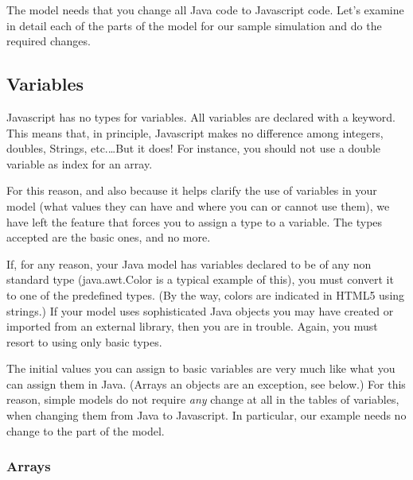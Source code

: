The model needs that you change all Java code to Javascript code. Let's examine in detail each of the parts of the model for our sample simulation and do the required changes.

\subsection{Variables}

Javascript has no types for variables. All variables are declared with a  keyword. This means that, in principle, Javascript makes no difference among integers, doubles, Strings, etc.\ldots But it does! For instance, you should not use a double variable as index for an array.

For this reason, and also because it helps clarify the use of variables in your model (what values they can have and where you can or cannot use them), we have left the feature that forces you to assign a type to a variable. The types accepted are the basic ones, and no more.

If, for any reason, your Java model has variables declared to be of any non standard type (java.awt.Color is a typical example of this), you must convert it to one of the predefined types. (By the way, colors are indicated in HTML5 using strings.) If your model uses sophisticated Java objects you may have created or imported from an external library, then you are in trouble. Again, you must resort to using only basic types.

The initial values you can assign to basic variables are very much like what you can assign them in Java. (Arrays an objects are an exception, see below.) For this reason, simple models do not require \emph{any} change at all in the tables of variables, when changing them from Java to Javascript.
In particular, our example needs no change to the  part of the model.

\subsubsection*{Arrays}

